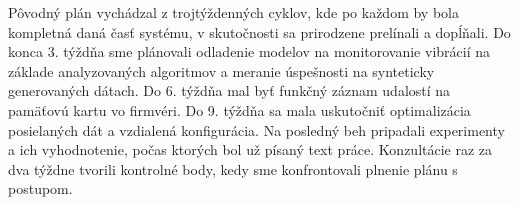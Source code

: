Pôvodný plán vychádzal z trojtýždenných cyklov, kde po každom by bola kompletná daná časť systému, v skutočnosti sa
prirodzene prelínali a dopĺňali. Do konca 3. týždňa sme plánovali odladenie modelov na monitorovanie vibrácií na základe
analyzovaných algoritmov a meranie úspešnosti na synteticky generovaných dátach. Do 6. týždňa mal byť funkčný
záznam udalostí na pamäťovú kartu vo firmvéri. Do 9. týždňa sa mala uskutočniť optimalizácia posielaných dát
a vzdialená konfigurácia. Na posledný beh pripadali experimenty a ich vyhodnotenie, počas ktorých bol už písaný text práce.
Konzultácie raz za dva týždne tvorili kontrolné body, kedy sme konfrontovali plnenie plánu s postupom.
\clearpage
